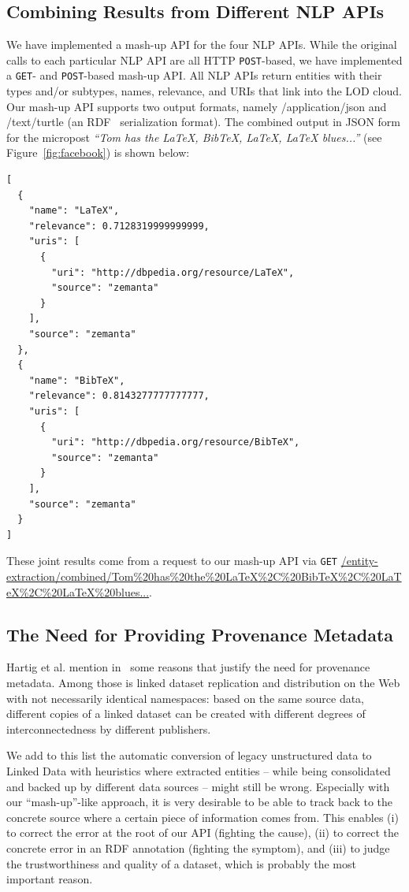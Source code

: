 \documentclass[conference]{IEEEtran}
\begin{document}
\subsection{Combining Results from Different NLP APIs}                     \label{sec:consolidation-nlp}
We have implemented a mash-up API for the four NLP APIs. While the original calls to each particular NLP API are all HTTP \texttt{POST}-based, we have implemented a \texttt{GET}- and \texttt{POST}-based mash-up API. All NLP APIs return entities with their types and/or subtypes, names, relevance, and URIs that link into the LOD cloud. Our mash-up API supports two output formats, namely /application/json and /text/turtle (an RDF~\cite{RDF} serialization format). The combined output in JSON form for the micropost \emph{``Tom has the LaTeX, BibTeX, LaTeX, LaTeX blues...''} (see Figure~\ref{fig:facebook}) is shown below:
\begin{lstlisting}
[
  {
    "name": "LaTeX",
    "relevance": 0.7128319999999999,
    "uris": [
      {
        "uri": "http://dbpedia.org/resource/LaTeX",
        "source": "zemanta"
      }
    ],
    "source": "zemanta"
  },
  {
    "name": "BibTeX",
    "relevance": 0.8143277777777777,
    "uris": [
      {
        "uri": "http://dbpedia.org/resource/BibTeX",
        "source": "zemanta"
      }
    ],
    "source": "zemanta"
  }  
]
\end{lstlisting}

These joint results come from a request to our mash-up API via \texttt{GET} \url{/entity-extraction/combined/Tom%20has%20the%20LaTeX%2C%20BibTeX%2C%20LaTeX%2C%20LaTeX%20blues...}.

\subsection{The Need for Providing Provenance Metadata}
Hartig et al. mention in~\cite{ipaw10:olaf} some reasons that justify the need for provenance metadata. Among those is linked dataset replication and distribution on the Web with not necessarily identical namespaces: based on the same source data, different copies of a linked dataset can be created with different degrees of interconnectedness by different publishers.

We add to this list the automatic conversion of legacy unstructured data to Linked Data with heuristics where extracted entities -- while being consolidated and backed up by different data sources -- might still be wrong. Especially with our ``mash-up''-like approach, it is very desirable to be able to track back to the concrete source where a certain piece of information comes from. This enables (i) to correct the error at the root of our API (fighting the cause), (ii) to correct the concrete error in an RDF annotation (fighting the symptom), and (iii) to judge the trustworthiness and quality of a dataset, which is probably the most important reason.
\end{document}
